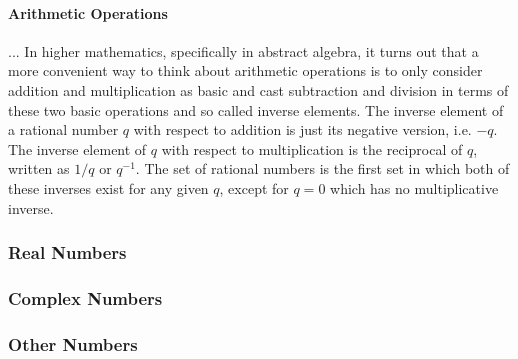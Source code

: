 \paragraph{Arithmetic Operations}
... In higher mathematics, specifically in abstract algebra, it turns out that a more convenient way to think about arithmetic operations is to only consider addition and multiplication as basic and cast subtraction and division in terms of these two basic operations and so called inverse elements. The inverse element of a rational number $q$ with respect to addition is just its negative version, i.e. $-q$. The inverse element of $q$ with respect to multiplication is the reciprocal of $q$, written as $1/q$ or $q^{-1}$. The set of rational numbers is the first set in which both of these inverses exist for any given $q$, except for $q=0$ which has no multiplicative inverse. 


\subsubsection{Real Numbers}



\subsubsection{Complex Numbers}


\subsubsection{Other Numbers}

\begin{comment}

-say something about countably and uncountably infinite sets (defined via power sets) - real numbers are uncountable but it's yet unknown if their cardinality is aleph1 or aleph2, i think
-numbers in the computer: 2-complement integers, IEEE754 float (half/single/double/quad), big int, big float, overflow, precision, precision loss in subtraction of similar values

\end{comment}


